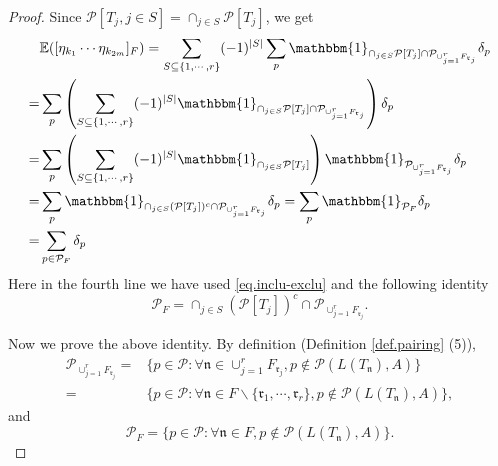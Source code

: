 \begin{proof}
Since $\mathcal{P}[T_j,j\in S]=\cap_{j\in S}\mathcal{P}[T_j]$, we get
\begin{equation}
    \begin{split}
        &\mathbb{E}([\eta_{k_1}\cdots \eta_{k_{2m}}]_F)=\sum_{S\subseteq\{1,\cdots,r\}}(-1)^{|S|}\sum_{p} \mathbbm{1}_{\cap_{j\in S}\mathcal{P}[T_j]\cap \mathcal{P}_{\cup_{j=1}^r F_{\mathfrak{r}_{j}}}} 
        \delta_p
        \\
        =&\sum_{p} \left(\sum_{S\subseteq\{1,\cdots,r\}}(-1)^{|S|}\mathbbm{1}_{\cap_{j\in S}\mathcal{P}[T_j]\cap \mathcal{P}_{\cup_{j=1}^r F_{\mathfrak{r}_{j}}}} \right)\delta_p 
        \\
        =& \sum_{p} \left(\sum_{S\subseteq\{1,\cdots,r\}}(-1)^{|S|}\mathbbm{1}_{\cap_{j\in S}\mathcal{P}[T_j]} \right)\mathbbm{1}_{ \mathcal{P}_{\cup_{j=1}^r F_{\mathfrak{r}_{j}}}}\delta_p
        \\
        =&\sum_{p} \mathbbm{1}_{\cap_{j\in S}(\mathcal{P}[T_j])^c\cap \mathcal{P}_{\cup_{j=1}^r F_{\mathfrak{r}_{j}}}} 
        \delta_p=\sum_{p} \mathbbm{1}_{\mathcal{P}_F} 
        \delta_p
        \\
        =&\sum_{p\in \mathcal{P}_F} \delta_p
    \end{split}
\end{equation}
Here in the fourth line we have used \eqref{eq.inclu-exclu} and the following identity
\begin{equation}\label{eq.lemrenorm5}
    \mathcal{P}_F = \cap_{j\in S}(\mathcal{P}[T_j])^c\cap \mathcal{P}_{\cup_{j=1}^r F_{\mathfrak{r}_{j}}}.
\end{equation}

Now we prove the above identity. By definition (Definition \ref{def.pairing} (5)), 
\begin{equation}
    \begin{split}
        \mathcal{P}_{\cup_{j=1}^r F_{\mathfrak{r}_{j}}}=&\{p\in\mathcal{P}:\forall \mathfrak{n}\in \cup_{j=1}^r F_{\mathfrak{r}_{j}},p\notin \mathcal{P}(L(T_{\mathfrak{n}}),A)\}
        \\
        =&\{p\in\mathcal{P}:\forall \mathfrak{n}\in F\backslash \{\mathfrak{r}_1,\cdots,\mathfrak{r}_r\},p\notin \mathcal{P}(L(T_{\mathfrak{n}}),A)\},
    \end{split}
\end{equation}
and 
\begin{equation}
    \mathcal{P}_F=\{p\in\mathcal{P}:\forall \mathfrak{n}\in F,p\notin \mathcal{P}(L(T_{\mathfrak{n}}),A)\}.
\end{equation}


\end{proof}
